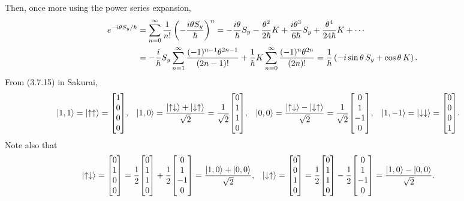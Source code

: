 \begin{solution}
	Then, once more using the power series expansion,
	\begin{align*}
		e^{-i \theta S_y / \hbar} &= \sum_{n = 0}^\infty \frac{1}{n!} \left( -\frac{i \theta S_y}{\hbar} \right)^n
		= -\frac{i \theta}{\hbar} S_y - \frac{\theta^2}{2 \hbar} K + \frac{i \theta^3}{6 \hbar} S_y + \frac{\theta^4}{24 \hbar} K + \cdots \\
		&= -\frac{i}{\hbar} S_y \sum_{n = 1}^\infty \frac{(-1)^{n-1} \theta^{2n - 1}}{(2n - 1)!} + \frac{1}{\hbar} K \sum_{n = 0}^\infty \frac{(-1)^n \theta^{2n}}{(2n)!}
		= \frac{1}{\hbar} \left( -i \sin{\theta} \, S_y + \cos{\theta} \, K \right).
	\end{align*}
	From (3.7.15) in Sakurai,
	\begin{align*}
		\kqq &= \kuu = \mqty[ 1 \\ 0 \\ 0 \\ 0 ], &
		\kqo &= \frac{\kud + \kdu}{\sqrt{2}} = \frac{1}{\sqrt{2}} \mqty[ 0 \\ 1 \\ 1 \\ 0 ], &
		\koo &= \frac{\kud - \kdu}{\sqrt{2}} = \frac{1}{\sqrt{2}} \mqty[ 0 \\ 1 \\ -1 \\ 0 ], &
		\kqnq &= \kdd = \mqty[ 0 \\ 0 \\ 0 \\ 1 ].
	\end{align*}
	Note also that
	\begin{align*}
		\kud &= \mqty[ 0 \\ 1 \\ 0 \\ 0 ] = \frac{1}{2} \mqty[ 0 \\ 1 \\ 1 \\ 0 ] + \frac{1}{2} \mqty[ 0 \\ 1 \\ -1 \\ 0 ] = \frac{\kqo + \koo}{\sqrt{2}}, &
		\kdu &= \mqty[ 0 \\ 0 \\ 1 \\ 0 ] = \frac{1}{2} \mqty[ 0 \\ 1 \\ 1 \\ 0 ] - \frac{1}{2} \mqty[ 0 \\ 1 \\ -1 \\ 0 ] = \frac{\kqo - \koo}{\sqrt{2}}.
	\end{align*}

\end{solution}
